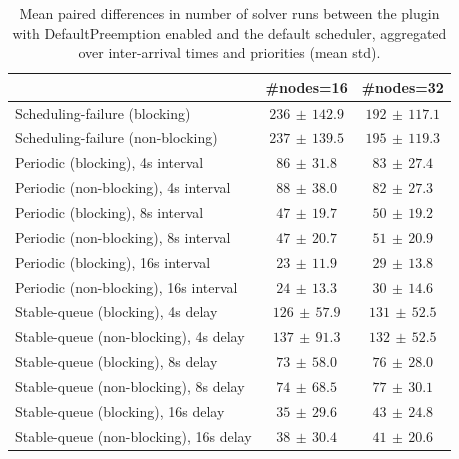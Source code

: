 \begin{table}[t]
\tiny
\setlength{\tabcolsep}{1.2pt}
\renewcommand{\arraystretch}{1.12}
\centering
\caption{Mean paired differences in number of solver runs between the plugin with DefaultPreemption enabled and the default scheduler, aggregated over inter-arrival times and priorities (mean \pm std).}
\label{tab:solver_runs-defpreempt1-std1-agg-arrival-prio}
\begin{tabular}{l c c}
\toprule
 & \#nodes=16 & \#nodes=32 \\
\midrule
Scheduling-failure (blocking) & $236\,\pm\,142.9$ & $192\,\pm\,117.1$ \\
Scheduling-failure (non-blocking) & $237\,\pm\,139.5$ & $195\,\pm\,119.3$ \\
Periodic (blocking), 4s interval & $86\,\pm\,31.8$ & $83\,\pm\,27.4$ \\
Periodic (non-blocking), 4s interval & $88\,\pm\,38.0$ & $82\,\pm\,27.3$ \\
Periodic (blocking), 8s interval & $47\,\pm\,19.7$ & $50\,\pm\,19.2$ \\
Periodic (non-blocking), 8s interval & $47\,\pm\,20.7$ & $51\,\pm\,20.9$ \\
Periodic (blocking), 16s interval & $23\,\pm\,11.9$ & $29\,\pm\,13.8$ \\
Periodic (non-blocking), 16s interval & $24\,\pm\,13.3$ & $30\,\pm\,14.6$ \\
Stable-queue (blocking), 4s delay & $126\,\pm\,57.9$ & $131\,\pm\,52.5$ \\
Stable-queue (non-blocking), 4s delay & $137\,\pm\,91.3$ & $132\,\pm\,52.5$ \\
Stable-queue (blocking), 8s delay & $73\,\pm\,58.0$ & $76\,\pm\,28.0$ \\
Stable-queue (non-blocking), 8s delay & $74\,\pm\,68.5$ & $77\,\pm\,30.1$ \\
Stable-queue (blocking), 16s delay & $35\,\pm\,29.6$ & $43\,\pm\,24.8$ \\
Stable-queue (non-blocking), 16s delay & $38\,\pm\,30.4$ & $41\,\pm\,20.6$ \\
\bottomrule
\end{tabular}
\end{table}
